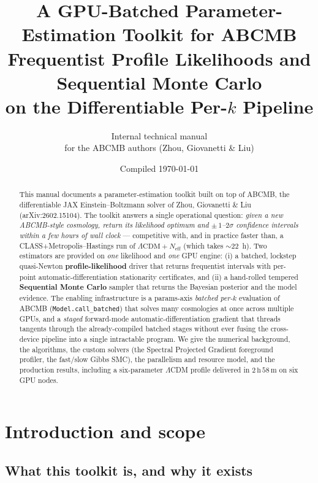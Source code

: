 \documentclass[11pt]{article}
\title{\textbf{A GPU-Batched Parameter-Estimation Toolkit for \textsc{ABCMB}}\\[4pt]
\large Frequentist Profile Likelihoods and Sequential Monte Carlo\\ on the Differentiable Per-$k$ Pipeline}
\author{Internal technical manual\\ \small for the \textsc{ABCMB} authors (Zhou, Giovanetti \& Liu)}
\date{Compiled \today}
\newcommand{\code}[1]{\texttt{\small #1}}
\newcommand{\Neff}{N_{\mathrm{eff}}}
\begin{document}
\maketitle

\begin{abstract}
\noindent
This manual documents a parameter-estimation toolkit built on top of
\textsc{ABCMB}, the differentiable JAX Einstein--Boltzmann solver of
Zhou, Giovanetti \& Liu (arXiv:2602.15104). The toolkit answers a single
operational question: \emph{given a new \textsc{ABCMB}-style cosmology,
return its likelihood optimum and $\pm\,1$--$2\sigma$ confidence
intervals within a few hours of wall clock} --- competitive with, and in
practice faster than, a CLASS+Metropolis--Hastings run of
$\Lambda\mathrm{CDM}+\Neff$ (which takes $\sim22$~h). Two estimators are
provided on \emph{one} likelihood and \emph{one} GPU engine: (i) a
batched, lockstep quasi-Newton \textbf{profile-likelihood} driver that
returns frequentist intervals with per-point automatic-differentiation
stationarity certificates, and (ii) a hand-rolled tempered
\textbf{Sequential Monte Carlo} sampler that returns the Bayesian
posterior and the model evidence. The enabling infrastructure is a
params-axis \emph{batched per-$k$} evaluation of \textsc{ABCMB}
(\code{Model.call\_batched}) that solves many cosmologies at once across
multiple GPUs, and a \emph{staged} forward-mode automatic-differentiation
gradient that threads tangents through the already-compiled batched
stages without ever fusing the cross-device pipeline into a single
intractable program. We give the numerical background, the algorithms,
the custom solvers (the Spectral Projected Gradient foreground profiler,
the fast/slow Gibbs SMC), the parallelism and resource model, and the
production results, including a six-parameter $\Lambda$CDM profile
delivered in $2\,\mathrm{h}\,58\,\mathrm{m}$ on six GPU nodes.
\end{abstract}

\tableofcontents
\clearpage

\section{Introduction and scope}
\label{sec:intro}

\subsection{What this toolkit is, and why it exists}
\end{document}
